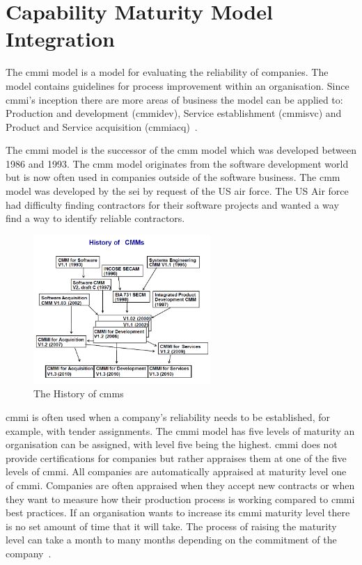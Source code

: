 \chapter{Capability Maturity Model Integration}

The \ac{cmmi} model is a model for evaluating the reliability of companies. The model contains guidelines for process improvement within an organisation. Since \ac{cmmi}'s inception there are more areas of business the model can be applied to: Production and development (\ac{cmmidev}), Service establishment (\ac{cmmisvc}) and Product and Service acquisition (\ac{cmmiacq})~\citep{ProductCMMIfor2010}.

The \ac{cmmi} model is the successor of the \ac{cmm} model which was developed between 1986 and 1993. The \ac{cmm} model originates from the software development world but is now often used in companies outside of the software business. The \ac{cmm} model was developed by the \ac{sei} by request of the US air force. The US Air force had difficulty finding contractors for their software projects and wanted a way find a way to identify reliable contractors.

\begin{figure}[!ht]
    \centering
        \includegraphics[width=0.6\textwidth]{graphics/cmmi_history}
    \caption{The History of \acp{cmm}}
    \label{fig:cmmi_history}
\end{figure}

\ac{cmmi} is often used when a company's reliability needs to be established, for example, with tender assignments. The \ac{cmmi} model has five levels of maturity an organisation can be assigned, with level five being the highest. \ac{cmmi} does not provide certifications for companies but rather appraises them at one of the five levels of \ac{cmmi}. All companies are automatically appraised at maturity level one of \ac{cmmi}. Companies are often appraised when they accept new contracts or when they want to measure how their production process is working compared to \ac{cmmi} best practices. If an organisation wants to increase its \ac{cmmi} maturity level there is no set amount of time that it will take. The process of raising the maturity level can take a month to many months depending on the commitment of the company~\citep{cmmifaq}. 

